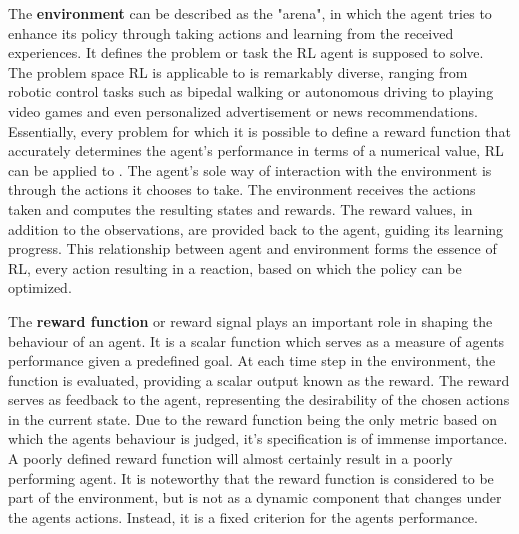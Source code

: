 

The \textbf{environment}  can be described as the "arena", in which the agent tries to enhance its policy through taking actions and learning from the received experiences.
It defines the problem or task the RL agent is supposed to solve.
The problem space RL is applicable to is remarkably diverse, ranging from robotic control tasks such as bipedal walking or autonomous driving to playing video games and even personalized advertisement or news recommendations.
Essentially, every problem for which it is possible to define a reward function that accurately determines the agent's performance in terms of a numerical value, RL can be applied to \parencite{silver2015}.
The agent's sole way of interaction with the environment is through the actions it chooses to take.
The environment receives the actions taken and computes the resulting states and rewards.
The reward values, in addition to the observations, are provided back to the agent, guiding its learning progress.
This relationship between agent and environment forms the essence of RL, every action resulting in a reaction, based on which the policy can be optimized.


\begin{comment}
Using the RL toolbox, 2 distinct types of environment are provided which differ in the definition of their action space.
If an environment has a discrete action space, it means that there exists countable, discrete actions which can be taken.
Discrete action spaces are used when the number of possible actions is limited and known in advance.
An example of such an environment would be a game of chess; for each turn there is a finite number of available moves.
Continuous action spaces on the other hand have a continuum of actions which can be taken and are used when the number of possible actions is infinite, such as the movement possibilities of a robotic arm.	
\end{comment}

The \textbf{reward function} or reward signal plays an important role in shaping the behaviour of an agent.
It is a scalar function which serves as a measure of agents performance given a predefined goal.
At each time step in the environment, the function is evaluated, providing a scalar output known as the reward.
The reward serves as feedback to the agent, representing the desirability of the chosen actions in the current state.
Due to the reward function being the only metric based on which the agents behaviour is judged, it's specification is of immense importance.
A poorly defined reward function will almost certainly result in a poorly performing agent.
It is noteworthy that the reward function is considered to be part of the environment, but is not as a dynamic component that changes under the agents actions.
Instead, it is a fixed criterion for the agents performance.
\parencite{sutton2018reinforcement}


